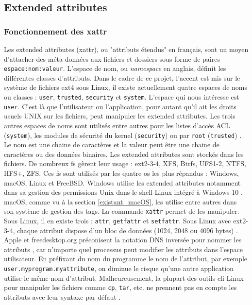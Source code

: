 \documentclass[a4paper, 12pt]{article}
\begin{document}
\subsection{Extended attributes}\label{extended_attributes}
\subsubsection{Fonctionnement des \acrshort{xattr}}
Les extended attributes (\acrshort{xattr}), ou "attributs étendus" en français, sont un moyen d'attacher des 
méta-données aux fichiers et dossiers sous forme de paires \texttt{espace:nom:valeur}. 
L'espace de nom, ou \textit{namespace} en anglais, définit les différentes classes d'attributs. 
Dans le cadre de ce projet, l'accent est mis sur le système de fichiers ext4 \cite{ref36}
sous Linux, il existe actuellement quatre espaces de noms 
ou classes : \texttt{user}, \texttt{trusted}, \texttt{security} et 
\texttt{system}. L'espace qui nous intéresse est \texttt{user}. C'est là que 
l'utilisateur ou l'application, pour autant qu'il ait les droits usuels UNIX sur les fichiers, peut 
manipuler les extended attributes. Les trois autres espaces de noms sont utilisés entre autres pour 
les listes d'accès ACL (\texttt{system}), les modules de sécurité du kernel 
(\texttt{security}) ou par \texttt{root} (\texttt{trusted})
\cite{ref11} \cite{ref12}.
Le nom est une chaine de caractères et la valeur peut être une chaine de caractères ou des données binaires. 
Les extended attributes sont stockés dans les fichiers. De nombreux \acrshort{fs} gèrent leur 
usage : ext2-3-4, XFS, Btrfs, UFS1-2, NTFS, HFS+, ZFS. Ces \acrshort{fs} sont utilisés par 
les quatre \acrshort{os} les plus répandus : Windows, macOS, Linux et FreeBSD. Windows utilise 
les extended attributes notamment dans sa gestion des permissions Unix dans le shell Linux intégré 
à Windows 10 \cite{ref21}. macOS, comme vu à la section \ref{existant_macOS}, les utilise entre 
autres dans son système de gestion des tags. La commande \texttt{xattr} permet de les 
manipuler. Sous Linux, il en existe trois : \texttt{attr}, \texttt{getfattr} et 
\texttt{setfattr}. Sous Linux avec ext2-3-4, chaque attribut dispose d'un bloc de données 
(1024, 2048 ou 4096 bytes) \cite{ref12}.
Apple et freedesktop.org préconisent la notation DNS inversée pour 
nommer les attributs \cite{ref8}, \cite{ref24} car n'importe quel processus peut modifier les 
attributs dans l'espace utilisateur. En préfixant du nom du programme le nom de l'attribut, par 
exemple \texttt{user.myprogram.myattribute}, on diminue le risque qu'une autre 
application utilise le même nom d'attribut. Malheureusement, la plupart des outils \acrshort{cli} Linux 
pour manipuler les fichiers comme \texttt{cp}, \texttt{tar}, etc. ne prennent 
pas en compte les attributs avec leur syntaxe par défaut \cite{ref4}.
\end{document}
